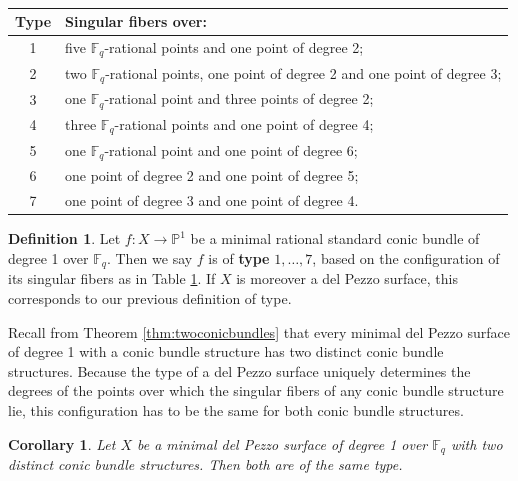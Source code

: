 \documentclass[a4paper, 11pt, reqno]{amsart}
\numberwithin{equation}{section} \numberwithin{figure}{section}
\newcommand{\term}[1]{\textbf{#1}}          %
\def \F {{\mathbb F}}
\def \P {{\mathbb P}}
\newcommand{\ra}{\rightarrow}
\newtheorem{corollary}[lemma]{Corollary}
\theoremstyle{definition}
\newtheorem{definition}[lemma]{Definition}
\numberwithin{lemma}{section}
\begin{document}
\begin{table}[h]
    \centering
   \begin{tabular}{|c|l|}
   \hline
    Type & Singular fibers over: \\
    \hline
    1 & five $\F_q$-rational points and one point of degree 2; \\
    2 & two $\F_q$-rational points, one point of degree 2 and one point of degree 3;\\
    3 & one $\F_q$-rational point and three points of degree 2;\\
    4 & three $\F_q$-rational points and one point of degree 4;\\
    5 & one $\F_q$-rational point and one point of degree 6;\\
    6 & one point of degree 2 and one point of degree 5;\\
    7 & one point of degree 3 and one point of degree 4.\\
    \hline
\end{tabular}
    \caption{}
    \label{tab:pointsbelowsingularfibers}
\end{table}

\begin{definition}\label{def:typeconicbundles}
    Let $f \colon X \ra \P^1$ be a minimal rational standard conic bundle of degree 1 over $\F_q$. Then we say $f$ is of \term{type} $1, \ldots, 7$, based on the configuration of its singular fibers as in Table \ref{tab:pointsbelowsingularfibers}. If $X$ is moreover a del Pezzo surface, this corresponds to our previous definition of type. 
\end{definition}

Recall from Theorem \ref{thm:twoconicbundles} that every minimal del Pezzo surface of degree 1 with a conic bundle structure has two distinct conic bundle structures. Because the type of a del Pezzo surface uniquely determines the degrees of the points over which the singular fibers of any conic bundle structure lie, this configuration has to be the same for both conic bundle structures. 

\begin{corollary}
    Let $X$ be a minimal del Pezzo surface of degree 1 over $\F_q$ with two distinct conic bundle structures. Then both are of the same type.
\end{corollary}

\end{document}
